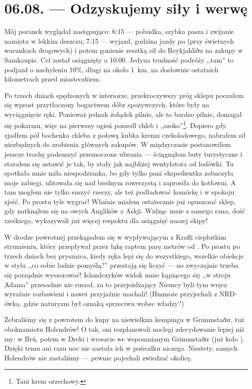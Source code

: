 \chapter*{06.08. --- Odzyskujemy siły i werwę}

Mój poranek wyglądał następująco: 6:15 --- pobudka, szybka pasza i zwijanie namiotu w lekkim deszczu; 7:15 --- wyjazd, godzina jazdy po  (przy świetnych warunkach drogowych) i potem gonienie resztką sił do Reykjahliðu na zakupy w Samkaupie. Cel został osiągnięty o 10:00. Jedyna trudność podróży ,,tam'' to podjazd o nachyleniu 10\%, długi na około 1~km, na dosłownie ostatnich kilometrach przed miasteczkiem.

Po trzech dniach spędzonych w interiorze, przekroczywszy próg sklepu poczułem się wprost przytłoczony bogactwem dóbr spożywczych, które były na wyciągnięcie ręki. Ponieważ jednak żołądek pilnie, ale to bardzo pilnie, domagał się pokarmu, więc na pierwszy ogień poszedł chleb i ,,szoko''\footnote{Tani krem orzechowy.}. Dopiero gdy zjadłem pół bochenka chleba z połową kubka kremu czekoladowego, nabrałem sił niezbędnych do zrobienia głównych zakupów. W międzyczasie postanowiłem jeszcze trochę podsuszyć przemoczone ubrania --- ściągnąłem buty turystyczne i starałem się ustawić je tak, by stały jak najbliżej wentylatora od lodówki. Tu spotkała mnie miła niespodzianka, bo gdy tylko pani ekspedientka zobaczyła moje zabiegi, ulitowała się nad biednym rowerzystą i zaprosiła do kotłowni. A tam mogłem nie tylko suszyć rzeczy, ale też podładować komórkę i w spokoju zjeść. Po prostu tyle wygrać! Właśnie miałem ostatecznie już opuszczać sklep, gdy natknąłem się na owych Anglików z Askji. Widząc mnie z samego rana, dość rześkiego, wykazywali już więcej respektu dla osiągnięć naszej ekipy!

W drodze powrotnej przekąpałem się w wypływającym z Krafli cieplutkim strumieniu, który przepływał przez łąkę raptem parę metrów od . Po prostu po trzech dniach bez prysznica, kiedy ręka lepi się do wszystkiego, wszelkie obiekcje w stylu ,,co sobie ludzie pomyślą?'' przestają się liczyć --- no zwyczajnie trzeba się porządnie wyszorować! Islandczyków widok mnie kąpiącego się ,,w stroju Adama'' przesadnie nie ruszał, za to przejeżdżający Niemcy byli tym wręcz wyraźnie rozbawieni i nawet przyjaźnie machali! (Hm\textellipsis może przyjechali z NRD-ówka, gdzie naturyzm był oznaką sprzeciwu wobec władzy?)

Zebraliśmy się z powrotem do kupy na niewielkim kempingu w Grimmstaðir, tuż obok\textellipsis namiotu Holendrów! O tak, oni rozplanowali noclegi zdecydowanie lepiej niż my: w Brú, potem w Dreki i wreszcie we wspomnianym Grimmstaðir (już koło ). Dzięki temu ani razu noc nie zastała ich w pośrodku niczego\textellipsis. Niestety, samych Holendrów nie zastaliśmy --- pewnie pojechali zwiedzać okolicę.

